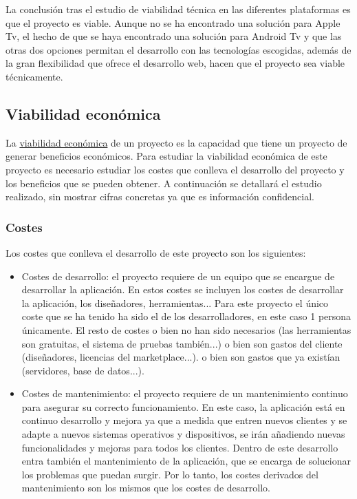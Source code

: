 La conclusión tras el estudio de viabilidad técnica en las diferentes plataformas es que el proyecto es viable.
Aunque no se ha encontrado una solución para Apple Tv, el hecho de que se haya encontrado una solución para Android Tv
y que las otras dos opciones permitan el desarrollo con las tecnologías escogidas, además de la gran flexibilidad que
ofrece el desarrollo web, hacen que el proyecto sea viable técnicamente.


\subsection{Viabilidad económica}
\label{subsec:analisis_estudio_viabilidad_economica}

La \href{https://es.wikipedia.org/wiki/Viabilidad_econ%C3%B3mica#:~:text=La%20viabilidad%20econ%C3%B3mica%20es%20la,de%20un%20proyecto%20o%20inversi%C3%B3n.}{viabilidad económica}
de un proyecto es la capacidad que tiene un proyecto de generar beneficios económicos. Para estudiar la viabilidad
económica de este proyecto es necesario estudiar los costes que conlleva el desarrollo del proyecto y los beneficios
que se pueden obtener. A continuación se detallará el estudio realizado, sin mostrar cifras concretas ya que es información
confidencial.

\subsubsection{Costes}
\label{subsubsec:analisis_estudio_viabilidad_economica_costes}

Los costes que conlleva el desarrollo de este proyecto son los siguientes:

\begin{itemize}
    \item Costes de desarrollo: el proyecto requiere de un equipo que se encargue de desarrollar la aplicación. En estos costes 
    se incluyen los costes de desarrollar la aplicación, los diseñadores, herramientas... Para este proyecto el único coste
    que se ha tenido ha sido el de los desarrolladores, en este caso 1 persona únicamente. El resto de costes o bien no han sido
    necesarios (las herramientas son gratuitas, el sistema de pruebas también...) o bien son gastos del cliente (diseñadores, licencias del marketplace...).
    o bien son gastos que ya existían (servidores, base de datos...).
    \item Costes de mantenimiento: el proyecto requiere de un mantenimiento continuo para asegurar su correcto funcionamiento.
    En este caso, la aplicación está en continuo desarrollo y mejora ya que a medida que entren nuevos clientes y se adapte a nuevos
    sistemas operativos y dispositivos, se irán añadiendo nuevas funcionalidades y mejoras para todos los clientes. Dentro de este
    desarrollo entra también el mantenimiento de la aplicación, que se encarga de solucionar los problemas que puedan surgir. Por lo tanto, 
    los costes derivados del mantenimiento son los mismos que los costes de desarrollo. 

\end{itemize}

